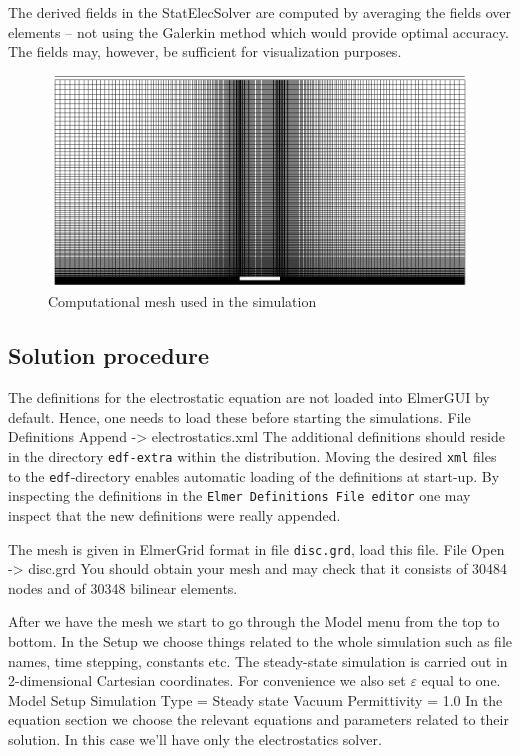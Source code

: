 The derived fields in the StatElecSolver are computed 
by averaging the fields over elements -- not using the 
Galerkin method which would provide optimal accuracy. The fields 
may, however, be sufficient for visualization purposes. 



\begin{figure}[h]
\centering
\includegraphics[width=120 mm]{mesh}
\caption{Computational mesh used in the simulation}\label{fg:es_geometry}
\end{figure}  




\subsection*{Solution procedure}

The definitions for the electrostatic equation are not loaded into ElmerGUI by default. Hence, 
one needs to load these before starting the simulations.
\ttbegin
File 
  Definitions
    Append -> electrostatics.xml
\ttend
The additional definitions should reside in the directory \texttt{edf-extra} within the distribution.
Moving the desired \texttt{xml} files to the \texttt{edf}-directory enables automatic loading of the 
definitions at start-up. By inspecting the definitions in the \texttt{Elmer Definitions File editor} one
may inspect that the new definitions were really appended. 


The mesh is given in ElmerGrid format in file \texttt{disc.grd}, load this file.
\ttbegin
File 
  Open -> disc.grd
\ttend
You should obtain your mesh and may check that it consists of 30484 nodes and of 30348 bilinear elements.


After we have the mesh we start to go through the Model menu from the top to bottom. 
In the Setup we choose things related to the whole simulation such as file names, 
time stepping, constants etc.
The steady-state simulation is carried out in 2-dimensional Cartesian
coordinates. For convenience we also set $\varepsilon$ equal to one. 
\ttbegin
Model
  Setup 
    Simulation Type = Steady state
    Vacuum Permittivity = 1.0
\ttend
In the equation section we choose the relevant equations and parameters related to their solution. 
In this case we'll have only the electrostatics solver. 

